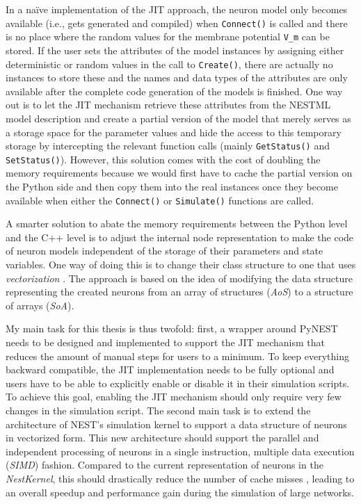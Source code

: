 In a na\"ive implementation of the JIT approach, the neuron model only becomes available (i.e., gets generated and compiled) when \texttt{Connect()} is called and there is no place where the random values for the membrane potential \texttt{V\_m} can be stored. If the user sets the attributes of the model instances by assigning either deterministic or random values in the call to \texttt{Create()}, there are actually no instances to store these and the names and data types of the attributes are only available after the complete code generation of the models is finished. One way out is to let the JIT mechanism retrieve these attributes from the NESTML model description and create a partial version of the model that merely serves as a storage space for the parameter values and hide the access to this temporary storage by intercepting the relevant function calls (mainly \texttt{GetStatus()} and \texttt{SetStatus()}). However, this solution comes with the cost of doubling the memory requirements because we would first have to cache the partial version on the Python side and then copy them into the real instances once they become available when either the \texttt{Connect()} or \texttt{Simulate()} functions are called.

A smarter solution to abate the memory requirements between the Python level and the C++ level is to adjust the internal node representation to make the code of neuron models independent of the storage of their parameters and state variables. One way of doing this is to change their class structure to one that uses \emph{vectorization} \citep{nuzman2006auto}. The approach is based on the idea of modifying the data structure representing the created neurons from an array of structures (\emph{AoS}) to a structure of arrays (\emph{SoA}).

My main task for this thesis is thus twofold: first, a wrapper around PyNEST needs to be designed and implemented to support the JIT mechanism that reduces the amount of manual steps for users to a minimum. To keep everything backward compatible, the JIT implementation needs to be fully optional and users have to be able to explicitly enable or disable it in their simulation scripts. To achieve this goal, enabling the JIT mechanism should only require very few changes in the simulation script. The second main task is to extend the architecture of NEST's simulation kernel to support a data structure of neurons in vectorized form. This new architecture should support the parallel and independent processing of neurons in a single instruction, multiple data execution (\emph{SIMD}) fashion. Compared to the current representation of neurons in the \emph{NestKernel}, this should drastically reduce the number of cache misses \citep{ghosh1997cache}, leading to an overall speedup and performance gain during the simulation of large networks.

